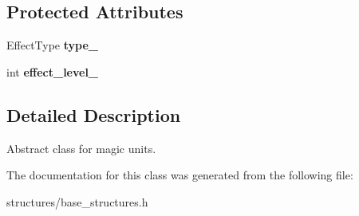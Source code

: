 \subsection*{Protected Attributes}
\begin{DoxyCompactItemize}
\item 
\mbox{\label{classbase__structures_1_1MagicSignature_a1a87a17c1bea64cd04c4826ab9db8183}} 
Effect\+Type {\bfseries type\+\_\+}
\item 
\mbox{\label{classbase__structures_1_1MagicSignature_a979b642f174624d18b0f73b902635e6b}} 
int {\bfseries effect\+\_\+level\+\_\+}
\end{DoxyCompactItemize}


\subsection{Detailed Description}
Abstract class for magic units. 

The documentation for this class was generated from the following file\+:\begin{DoxyCompactItemize}
\item 
structures/base\+\_\+structures.\+h\end{DoxyCompactItemize}
